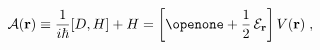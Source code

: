 \begin{equation}
{\mathcal A} ({\bf r})
\equiv
\frac{1}{i \hbar}
[D,H] +  H
=
\left[
\openone
+
\frac{1}{2}
\,
{\mathcal E}_{\bf r}
 \right]
V ({\bf r})
\;  ,
\label{eq:time_rate_of_dilation_op}
\end{equation}

